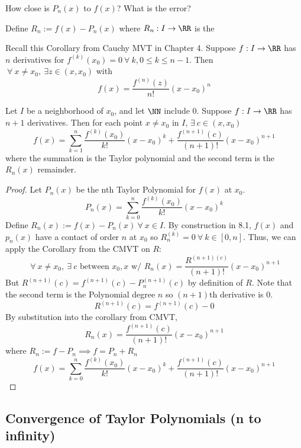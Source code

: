 \documentclass[12pt]{scrartcl}
\begin{document}
How close is $P_n(x)$ to $f(x)$? What is the error?

\begin{definition}
  Define $R_n := f(x) - P_n(x)$ where $R_n: I \to \RR$ is the 
\end{definition}

\begin{note}
  Recall this Corollary from Cauchy MVT in Chapter 4. 
  Suppose $f: I \to \RR$ has $n$ derivatives for $f^{(k)}(x_0) = 0 \ \forall \ k, 0 \leq k \leq n-1$. 
  Then $\ \forall \ x \neq x_0, \ \exists z \in (x, x_0)$ with 
  \[f(x) = \frac{f^{(n)}(z)}{n!}(x-x_0)^n\]
\end{note}

\begin{theorem}
  Let $I$ be a neighborhood of $x_0$, and let $\NN$ include $0$. 
  Suppose $f: I \to \RR$ has $n + 1$ derivatives. Then for each point $x \neq x_0$ in $I$, $\exists \ c \in (x, x_0)$
  \[f(x) = \sum_{k=1}^n \frac{f^{(k)}(x_0)}{k!}(x-x_0)^k + \frac{f^{(n+1)}(c)}{(n+1)!}(x-x_0)^{n+1}\]
  where the summation is the Taylor polynomial and the second term is the $R_n(x)$ remainder.

  \begin{proof}
    Let $P_n(x)$ be the nth Taylor Polynomial for $f(x)$ at $x_0$. 
    \[P_n(x) = \sum_{k=0}^n \frac{f^{(k)}(x_0)}{k!}(x-x_0)^k\]
    Define $R_n(x) := f(x) - P_n(x) \ \forall \ x \in I$. By construction in 8.1, 
    $f(x)$ and $p_n(x)$ have a contact of order $n$ at $x_0$
    so $R_n^{(k)} = 0 \ \forall \ k \in [0, n]$. Thus, we can apply the Corollary from the CMVT on $R$:
    \[\ \forall \ x \neq x_0, \ \exists \ c \text{ between } x_0, x \text{ w/ } R_n(x) = \frac{R^{(n+1)(c)}}{(n+1)!}(x-x_0)^{n+1}\]
    But $R^{(n+1)}(c) = f^{(n+1)}(c) - P_n^{(n+1)}(c)$ by definition of $R$. 
    Note that the second term is the Polynomial degree $n$ so $(n+1)$th derivative is $0$.
    \[R^{(n+1)}(c) = f^{(n+1)}(c) - 0\]
    By substitution into the corollary from CMVT, 
    \[R_n(x) = \frac{f^{(n+1)}(c)}{(n+1)!}(x-x_0)^{n+1}\]
    where $R_n := f - P_n \implies f = P_n + R_n$
    \[f(x) = \sum_{k=0}^n \frac{f^{(k)}(x_0)}{k!}(x-x_0)^k + \frac{f^{(n+1)}(c)}{(n+1)!}(x-x_0)^{n+1}\]
  \end{proof}
\end{theorem}

\subsection{Convergence of Taylor Polynomials (n to infinity)}
\end{document}
